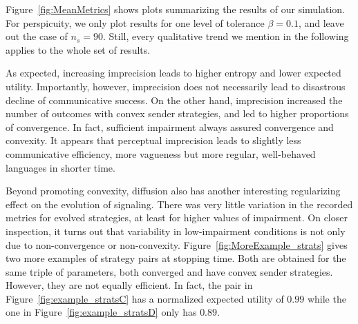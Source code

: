\documentclass[fleqn,reqno,10pt]{article}
\begin{document}
Figure~\ref{fig:MeanMetrics} shows plots summarizing the results of
our simulation. For perspicuity, we only plot results for one level of
tolerance $\beta = 0.1$, and leave out the case of $n_s = 90$. Still,
every qualitative trend we mention in the following applies to the
whole set of results.

As expected, increasing imprecision leads to higher entropy and lower
expected utility. Importantly, however, imprecision does not
necessarily lead to disastrous decline of communicative success. On
the other hand, imprecision increased the number of outcomes with
convex sender strategies, and led to higher proportions of
convergence. In fact, sufficient impairment always assured convergence
and convexity. It appears that perceptual imprecision leads to
slightly less communicative efficiency, more vagueness but more
regular, well-behaved languages in shorter time.

Beyond promoting convexity, diffusion also has another interesting
regularizing effect on the evolution of signaling. There was very
little variation in the recorded metrics for evolved strategies, at
least for higher values of impairment. On closer inspection, it turns
out that variability in low-impairment conditions is not only due to
non-convergence or non-convexity. Figure~\ref{fig:MoreExample_strats}
gives two more examples of strategy pairs at stopping time. Both are
obtained for the same triple of parameters, both converged and have
convex sender strategies. However, they are not equally efficient. In
fact, the pair in Figure~\ref{fig:example_stratsC} has a normalized
expected utility of $0.99$ while the one in
Figure~\ref{fig:example_stratsD} only has $0.89$.
\end{document}
